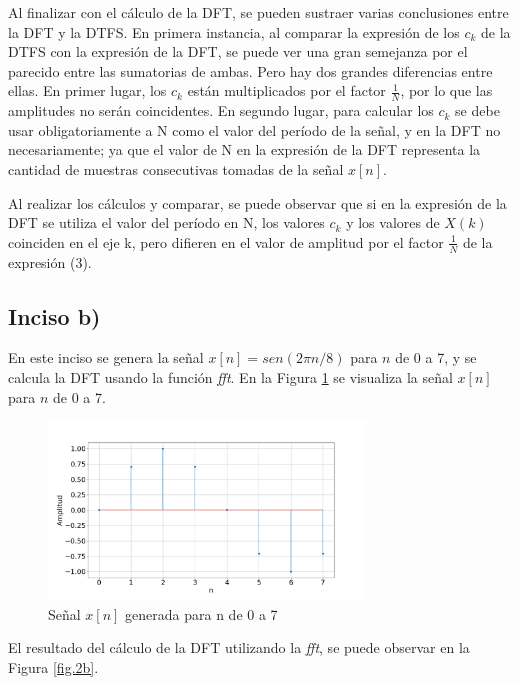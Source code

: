 \documentclass{article}
\begin{document}

Al finalizar con el cálculo de la DFT, se pueden sustraer varias conclusiones entre la DFT y la DTFS. En primera instancia, al comparar la expresión de los $c_{k}$ de la DTFS con la expresión de la DFT, se puede ver una gran semejanza por el parecido entre las sumatorias de ambas. Pero hay dos grandes diferencias entre ellas. En primer lugar, los $c_{k}$ están multiplicados por el factor $\frac{1}{N}$, por lo que las amplitudes no serán coincidentes. En segundo lugar, para calcular los $c_{k}$ se debe usar obligatoriamente a N como el valor del período de la señal, y en la DFT no necesariamente; ya que el valor de N en la expresión de la DFT representa la cantidad de muestras consecutivas tomadas de la señal $x[n]$.

Al realizar los cálculos y comparar, se puede observar que si en la expresión de la DFT se utiliza el valor del período en N, los valores $c_{k}$ y los valores de $X(k)$ coinciden en el eje k, pero difieren en el valor de amplitud por el factor $\frac{1}{N}$ de la expresión (3).

\subsection*{Inciso b)}
En este inciso se genera la señal $x[n]=sen(2 \pi n /8)$ para $n$ de 0 a 7, y se calcula la DFT usando la función \textit{fft}.
En la Figura \ref{fig.1b} se visualiza la señal $x[n]$ para $n$ de 0 a 7.

\begin{figure}[H]
\centering
\includegraphics[width=0.75\textwidth]{Img/punto_1_b_signal.png}
\caption{Señal $x[n]$ generada para n de 0 a 7}
\label{fig.1b}
\end{figure}

El resultado del cálculo de la DFT utilizando la \textit{fft}, se puede observar en la Figura \ref{fig.2b}.
\end{document}
